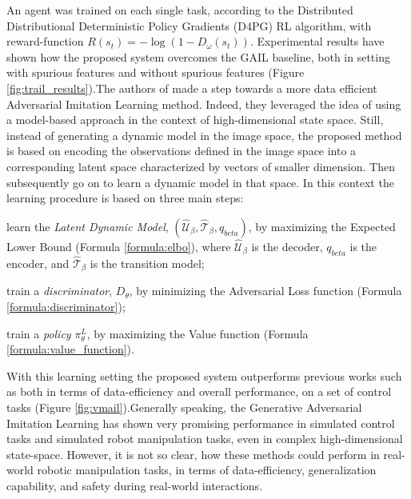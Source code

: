 An agent was trained on each single task, according to the Distributed Distributional Deterministic Policy Gradients (D4PG) \cite{barth2018d4pg} RL algorithm, with reward-function $R(s_{t}) = - \log(1-D_{\omega}(s_{t}))$. Experimental results have shown how the proposed system overcomes the GAIL \cite{ho2016gail} baseline, both in setting with spurious features and without spurious features (Figure \ref{fig:trail_results}).\unskip The authors of \cite{rafailov2021visual_ail} made a step towards a more data efficient Adversarial Imitation Learning method. Indeed, they leveraged the idea of using a model-based approach in the context of high-dimensional state space. Still, instead of generating a dynamic model in the image space, the proposed method is based on encoding the observations defined in the image space into a corresponding latent space characterized by vectors of smaller dimension. Then subsequently go on to learn a dynamic model in that space. In this context the learning procedure is based on three main steps: \begin{enumerate*}[label=\textbf{(\arabic*)}]
    \item learn the \textit{Latent Dynamic Model}, $(\hat{\mathcal{U}}_{\beta},\hat{\mathcal{T}}_{\beta}, q_{beta})$, by maximizing the Expected Lower Bound (Formula \ref{formula:elbo}), where $\hat{\mathcal{U}}_{\beta}$ is the decoder, $q_{beta}$ is the encoder, and $\hat{\mathcal{T}}_{\beta}$ is the transition model;
    \item train a \textit{discriminator}, $D_{\theta}$, by minimizing the Adversarial Loss function (Formula \ref{formula:discriminator});
    \item train a \textit{policy} $\pi^{L}_{\theta}$, by maximizing the Value function (Formula \ref{formula:value_function}).
\end{enumerate*}
%

\noindent With this learning setting the proposed system outperforms previous works such as \cite{reddy2019sqil,kostrikov2018discriminator} both in terms of data-efficiency and overall performance, on a set of control tasks (Figure \ref{fig:vmail}).Generally speaking, the Generative Adversarial Imitation Learning has shown very promising performance in simulated control tasks and simulated robot manipulation tasks, even in complex high-dimensional state-space. However, it is not so clear, how these methods could perform in real-world robotic manipulation tasks, in terms of data-efficiency, generalization capability, and safety during real-world interactions.
